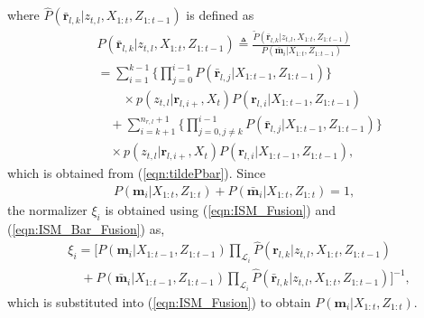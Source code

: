 \documentclass[letterpaper, 10pt, conference]{ieeeconf}
\newcommand{\refeqn}[1]{(\ref{eqn:#1})}
\begin{document}
where $\hat P(\bar{\mathbf{r}}_{l,k}|z_{t,l},X_{1:t},Z_{1:t-1})$ is defined as
\begin{align}
&\hat P(\bar{\mathbf{r}}_{l,k}|z_{t,l},X_{1:t},Z_{1:t-1})
\triangleq\frac{\tilde P(\bar{\mathbf{r}}_{l,k}|z_{t,l},X_{1:t},Z_{1:t-1})}{P(\bar{\mathbf{m}}_i|X_{1:t},Z_{1:t-1})}
\nonumber\\
&=\sum_{i=1}^{k-1}\bigg\{\prod_{j=0}^{i-1}P(\bar{\mathbf{r}}_{l,j}|X_{1:t-1},Z_{1:t-1})\bigg\}\nonumber\\&\quad\quad\times p(z_{t,l}|\mathbf{r}_{l,i+},X_t)P(\mathbf{r}_{l,i}|X_{1:t-1},Z_{1:t-1})
\nonumber
\\
&\quad
+
\sum_{i=k+1}^{n_{r,l}+1}\bigg\{\prod_{j=0,j\neq k}^{i-1}P(\bar{\mathbf{r}}_{l,j}|X_{1:t-1},Z_{1:t-1})\bigg\}\nonumber\\&\quad\times p(z_{t,l}|\mathbf{r}_{l,i+},X_t)P(\mathbf{r}_{l,i}|X_{1:t-1},Z_{1:t-1}),
\end{align}
which is obtained from \refeqn{tildePbar}. %
Since 
\begin{align*}
P(\mathbf{m}_i|X_{1:t},Z_{1:t})+P(\bar{\mathbf{m}}_i|X_{1:t},Z_{1:t})=1,
\end{align*}
the normalizer $\xi_i$ is obtained using \refeqn{ISM_Fusion} and \refeqn{ISM_Bar_Fusion} as,
\begin{align}
&\xi_i=
\bigg[
P(\mathbf{m}_i|{X_{1:t-1}},Z_{1:t-1})
\prod_{\mathcal L_i}
\hat P(\mathbf{r}_{l,k}|z_{t,l},{X_{1:t}},Z_{1:t-1})
\nonumber\\&\quad
+
P(\bar{\mathbf{m}}_i|{X_{1:t-1}},Z_{1:t-1})
\prod_{\mathcal L_i}
\hat P(\bar{\mathbf{r}}_{l,k}|z_{t,l},X_{1:t},Z_{1:t-1})
\bigg]^{-1},\label{eqn:xi}
\end{align}
which is substituted into \refeqn{ISM_Fusion} to obtain $P(\mathbf{m}_i|X_{1:t},Z_{1:t})$.%

\end{document}
